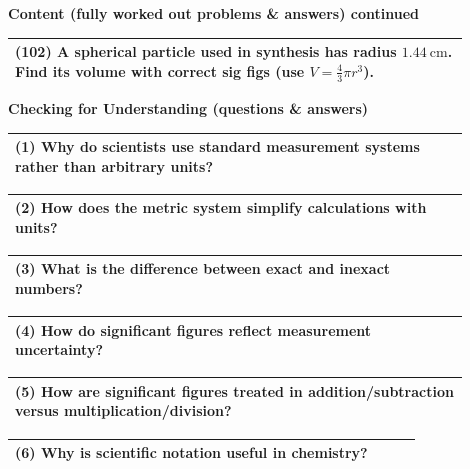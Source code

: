 \documentclass{article}
\begin{document}
\noindent
{\large \textbf{Content (fully worked out problems \& answers) continued}} \\[0.2em]
\begin{tabular}{|p{0.9\linewidth}|}
\hline
\vspace{0.2cm}
\textbf{(102)} A spherical particle used in synthesis has radius $1.44~\text{cm}$. Find its volume with correct sig figs (use $V=\tfrac{4}{3}\pi r^3$). \\
\hline
\end{tabular}
\newpage

\newpage
\noindent
{\large \textbf{Checking for Understanding (questions \& answers)}}

\begin{tabular}{|p{0.9\linewidth}|}
\hline
\textbf{(1) Why do scientists use standard measurement systems rather than arbitrary units?} \\ \hline
\end{tabular}
\newpage

\begin{tabular}{|p{0.9\linewidth}|}
\hline
\textbf{(2) How does the metric system simplify calculations with units?} \\ \hline
\end{tabular}
\newpage

\begin{tabular}{|p{0.9\linewidth}|}
\hline
\textbf{(3) What is the difference between exact and inexact numbers?} \\ \hline
\end{tabular}
\newpage

\begin{tabular}{|p{0.9\linewidth}|}
\hline
\textbf{(4) How do significant figures reflect measurement uncertainty?} \\ \hline
\end{tabular}
\newpage

\begin{tabular}{|p{0.9\linewidth}|}
\hline
\textbf{(5) How are significant figures treated in addition/subtraction versus multiplication/division?} \\ \hline
\end{tabular}
\newpage

\begin{tabular}{|p{0.9\linewidth}|}
\hline
\textbf{(6) Why is scientific notation useful in chemistry?} \\ \hline
\end{tabular}
\newpage
\end{document}
